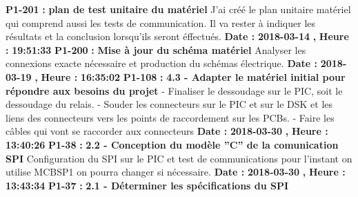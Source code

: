 \documentclass{article}%
\begin{document}
\newline%
%
\textbf{P1{-}201 }%
\textbf{ : }%
\textbf{ plan de test unitaire du matériel}%
\newline%
\newline%
%
J'ai créé le plan unitaire matériel qui comprend aussi les tests de communication. Il va rester à indiquer les résultats et la conclusion lorsqu'ils seront éffectués.\newline%
\newline%
%
\textbf{Date : }%
\textbf{2018{-}03{-}14}%
\textbf{,}%
\textbf{ Heure : }%
\textbf{19:51:33}%
\newline%
%
\textbf{P1{-}200 }%
\textbf{ : }%
\textbf{ Mise à jour du schéma matériel}%
\newline%
\newline%
%
Analyser les connexions exacte nécessaire et production du schémas électrique.\newline%
\newline%
%
\textbf{Date : }%
\textbf{2018{-}03{-}19}%
\textbf{,}%
\textbf{ Heure : }%
\textbf{16:35:02}%
\newline%
%
\textbf{P1{-}108 }%
\textbf{ : }%
\textbf{ 4.3 {-} Adapter le matériel initial pour répondre aux besoins du projet}%
\newline%
\newline%
%
{-} Finaliser le dessoudage sur le PIC, soit le dessoudage du relais.\newline%
{-} Souder les connecteurs sur le PIC et sur le DSK et les liens des connecteurs vers les points de raccordement sur les PCBs.\newline%
{-} Faire les câbles qui vont se raccorder aux connecteurs\newline%
\newline%
%
\textbf{Date : }%
\textbf{2018{-}03{-}30}%
\textbf{,}%
\textbf{ Heure : }%
\textbf{13:40:26}%
\newline%
%
\textbf{P1{-}38 }%
\textbf{ : }%
\textbf{ 2.2 {-} Conception du modèle ''C'' de la comunication SPI}%
\newline%
\newline%
%
Configuration du SPI sur le PIC et test de communications pour l'instant on utilise MCBSP1 on pourra changer si nécessaire. \newline%
\newline%
%
\textbf{Date : }%
\textbf{2018{-}03{-}30}%
\textbf{,}%
\textbf{ Heure : }%
\textbf{13:43:34}%
\newline%
%
\textbf{P1{-}37 }%
\textbf{ : }%
\textbf{ 2.1 {-} Déterminer les spécifications du SPI}%
\end{document}
